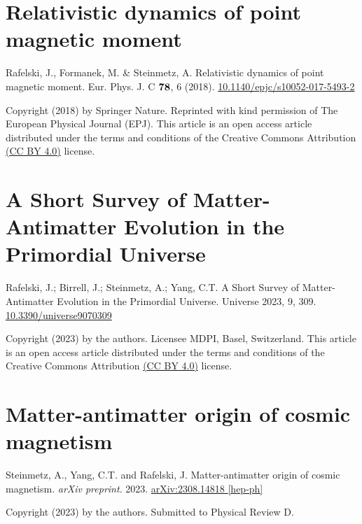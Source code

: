 %

\chapter{Relativistic dynamics of point magnetic moment}
\label{appendixC}
\begin{center}
Rafelski, J., Formanek, M. \& Steinmetz, A. Relativistic dynamics of point magnetic moment. Eur. Phys. J. C $\boldsymbol{78}$, 6 (2018). \href{https://doi.org/10.1140/epjc/s10052-017-5493-2}{10.1140/epjc/s10052-017-5493-2}
\end{center}

\noindent Copyright (2018) by Springer Nature. Reprinted with kind permission of The European Physical Journal (EPJ). This article is an open access article distributed under the terms and conditions of the Creative Commons Attribution \href{https://creativecommons.org/licenses/by/4.0/}{(CC BY 4.0)} license.

%

\chapter{A Short Survey of Matter-Antimatter Evolution in the Primordial Universe}
\label{appendixD}
\begin{center}
Rafelski, J.; Birrell, J.; Steinmetz, A.; Yang, C.T. A Short Survey of Matter-Antimatter Evolution in the Primordial Universe. Universe 2023, 9, 309. \href{https://doi.org/10.3390/universe9070309}{10.3390/universe9070309}
\end{center}

\noindent Copyright (2023) by the authors. Licensee MDPI, Basel, Switzerland. This article is an open access article distributed under the terms and conditions of the Creative Commons Attribution \href{https://creativecommons.org/licenses/by/4.0/}{(CC BY 4.0)} license.

%

\chapter{Matter-antimatter origin of cosmic magnetism}
\label{appendixE}
\begin{center}
Steinmetz, A., Yang, C.T. and Rafelski, J. Matter-antimatter origin of cosmic magnetism. \emph{arXiv preprint}. 2023. \href{https://arxiv.org/abs/2308.14818}{arXiv:2308.14818 [hep-ph]}
\end{center}

\noindent Copyright (2023) by the authors. Submitted to Physical Review D.

%
